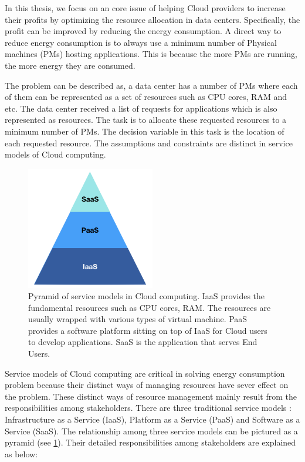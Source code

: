In this thesis, we focus on an core issue of helping Cloud providers to increase their profits by optimizing the resource allocation in data centers. Specifically, the profit can be improved by reducing the energy consumption. A direct way to reduce energy consumption is to always use a minimum number of Physical machines (PMs) hosting applications. This is because the more PMs are running, the more energy they are 
consumed.

The problem can be described as, a data center has a number of PMs where each of them can be represented as a set of resources such as CPU cores, RAM and etc. The data center received a list of requests for applications which is also represented as resources. The task is to allocate these requested resources to a minimum number of PMs. The decision variable in this task is the location of each requested resource. The assumptions and constraints are distinct in service models of Cloud computing.

\begin{figure}
	\centering
	\includegraphics[width=0.5\textwidth]{pics/pyramid.png}
	\caption{Pyramid of service models in Cloud computing. 
	IaaS provides the fundamental resources such as CPU cores, RAM. The resources are usually wrapped with various types of virtual machine. PaaS provides a software platform sitting on top of IaaS for Cloud users to develop applications. SaaS is the application that serves End Users.}
	\label{fig:pyramid}
\end{figure} 


Service models of Cloud computing are critical in solving energy consumption problem because their distinct ways of managing resources have sever effect on the problem. These distinct ways of resource management mainly result from the responsibilities among stakeholders. There are three traditional service models \cite{Mell:2011jj}: Infrastructure as a Service (IaaS), Platform as a Service (PaaS) and Software as a Service (SaaS). The relationship among three service models can be pictured as a pyramid (see \ref{fig:pyramid}). Their detailed responsibilities among stakeholders are explained as below:


